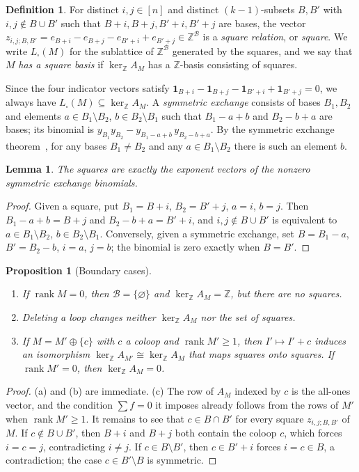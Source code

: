 \documentclass[11pt,a4paper]{article}
\theoremstyle{plain}
\newtheorem{lemma}[theorem]{Lemma}
\newtheorem{proposition}[theorem]{Proposition}
\theoremstyle{definition}
\newtheorem{definition}[theorem]{Definition}
\newcommand{\Z}{\mathbb Z}
\newcommand{\AM}{A_M}
\newcommand{\kerZ}{\ker_{\Z}\!A_M}
\newcommand{\sq}{L_{\square}}
\newcommand{\bs}{\mathcal B}
\newcommand{\rank}{\operatorname{rank}}
\newcommand{\ind}{\mathbf 1}
\begin{document}
\begin{definition}\label{def:square}
For distinct $i,j\in[n]$ and distinct $(k-1)$-subsets $B,B'$ with $i,j\notin B\cup B'$ such that $B+i,B+j,B'+i,B'+j$ are bases, the vector $z_{i,j;B,B'}=e_{B+i}-e_{B+j}-e_{B'+i}+e_{B'+j}\in\Z^{\bs}$ is a \emph{square relation}, or \emph{square}. We write $\sq(M)$ for the sublattice of $\Z^{\bs}$ generated by the squares, and we say that $M$ \emph{has a square basis} if $\kerZ$ has a $\Z$-basis consisting of squares.
\end{definition}
Since the four indicator vectors satisfy $\ind_{B+i}-\ind_{B+j}-\ind_{B'+i}+\ind_{B'+j}=0$, we always have $\sq(M)\subseteq\kerZ$. A \emph{symmetric exchange} consists of bases $B_1,B_2$ and elements $a\in B_1\setminus B_2$, $b\in B_2\setminus B_1$ such that $B_1-a+b$ and $B_2-b+a$ are bases; its binomial is $y_{B_1}y_{B_2}-y_{B_1-a+b}\,y_{B_2-b+a}$. By the symmetric exchange theorem~\cite{Br69}, for any bases $B_1\ne B_2$ and any $a\in B_1\setminus B_2$ there is such an element $b$.

\begin{lemma}\label{lem:sym}
The squares are exactly the exponent vectors of the nonzero symmetric exchange binomials.
\end{lemma}
\begin{proof}
Given a square, put $B_1=B+i$, $B_2=B'+j$, $a=i$, $b=j$. Then $B_1-a+b=B+j$ and $B_2-b+a=B'+i$, and $i,j\notin B\cup B'$ is equivalent to $a\in B_1\setminus B_2$, $b\in B_2\setminus B_1$. Conversely, given a symmetric exchange, set $B=B_1-a$, $B'=B_2-b$, $i=a$, $j=b$; the binomial is zero exactly when $B=B'$.
\end{proof}

\begin{proposition}[Boundary cases]\label{prop:edge}
\begin{enumerate}[label=(\alph*),itemsep=1pt]
\item If $\rank M=0$, then $\bs=\{\varnothing\}$ and $\kerZ=\Z$, but there are no squares.
\item Deleting a loop changes neither $\kerZ$ nor the set of squares.
\item If $M=M'\oplus\{c\}$ with $c$ a coloop and $\rank M'\ge1$, then $I'\mapsto I'+c$ induces an isomorphism $\ker_\Z A_{M'}\cong\kerZ$ that maps squares onto squares. If $\rank M'=0$, then $\kerZ=0$.
\end{enumerate}
\end{proposition}
\begin{proof}
(a) and (b) are immediate. (c) The row of $\AM$ indexed by $c$ is the all-ones vector, and the condition $\sum f=0$ it imposes already follows from the rows of $M'$ when $\rank M'\ge1$. It remains to see that $c\in B\cap B'$ for every square $z_{i,j;B,B'}$ of $M$. If $c\notin B\cup B'$, then $B+i$ and $B+j$ both contain the coloop $c$, which forces $i=c=j$, contradicting $i\ne j$. If $c\in B\setminus B'$, then $c\in B'+i$ forces $i=c\in B$, a contradiction; the case $c\in B'\setminus B$ is symmetric.
\end{proof}
\end{document}
